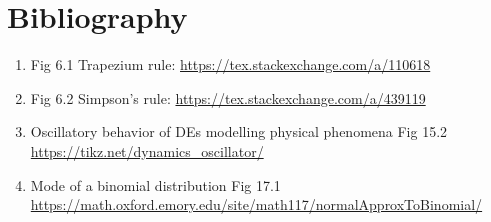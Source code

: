 \documentclass[oneside]{book}
\begin{document}


\chapter{Bibliography}
\begin{enumerate}
  \item Fig 6.1 Trapezium rule: \url{https://tex.stackexchange.com/a/110618}
  \item Fig 6.2 Simpson's rule: \url{https://tex.stackexchange.com/a/439119}
  \item Oscillatory behavior of DEs modelling physical phenomena Fig 15.2 \url{https://tikz.net/dynamics_oscillator/}
  \item Mode of a binomial distribution Fig 17.1 \url{https://math.oxford.emory.edu/site/math117/normalApproxToBinomial/}
\end{enumerate}
\end{document}
